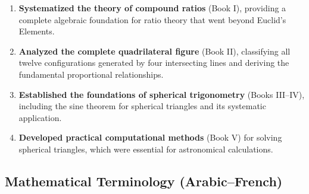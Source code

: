 \documentclass[11pt,a4paper]{article}
\theoremstyle{plain}
\theoremstyle{definition}
\theoremstyle{remark}
\begin{document}
\begin{enumerate}

\item \textbf{Systematized the theory of compound ratios} (Book I), providing a complete algebraic foundation for ratio theory that went beyond Euclid's Elements.

\item \textbf{Analyzed the complete quadrilateral figure} (Book II), classifying all twelve configurations generated by four intersecting lines and deriving the fundamental proportional relationships.

\item \textbf{Established the foundations of spherical trigonometry} (Books III--IV), including the sine theorem for spherical triangles and its systematic application.

\item \textbf{Developed practical computational methods} (Book V) for solving spherical triangles, which were essential for astronomical calculations.

\end{enumerate}



\subsection*{Mathematical Terminology (Arabic--French)}
\end{document}
